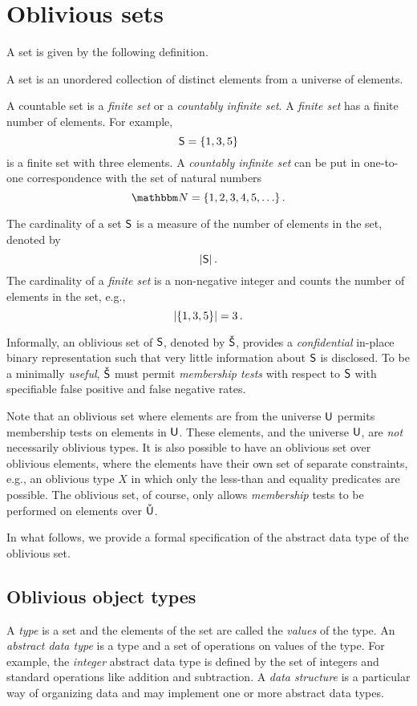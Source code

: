 \documentclass[ ../main.tex]{subfiles}
\begin{document}
\section{Oblivious sets}
\label{sec:ob_set_def}
A set is given by the following definition.
\begin{definition}
A set is an unordered collection of distinct elements from a universe of elements.
\end{definition}

A countable set is a \emph{finite set} or a \emph{countably infinite set}. A \emph{finite set} has a finite number of elements. For example,
\[
    \Set{S} = \{ 1, 3, 5 \}
\]
is a finite set with three elements. A \emph{countably infinite set} can be put in one-to-one correspondence with the set of natural numbers
\begin{equation}
    \NatSet = \{1,2,3,4,5,\ldots\}\,.
\end{equation}

The cardinality of a set $\Set{S}$ is a measure of the number of elements in the set, denoted by
\begin{equation}
    \Card{\Set{S}}\,.
\end{equation}
The cardinality of a \emph{finite set} is a non-negative integer and counts the number of elements in the set, e.g.,
\[
    \lvert\left\{ 1, 3, 5\right\}\rvert = 3\,.
\]

Informally, an oblivious set of $\Set{S}$, denoted by $\OSet{S}$, provides a \emph{confidential} in-place binary representation such that very little information about $\Set{S}$ is disclosed.
To be a minimally \emph{useful}, $\OSet{S}$ must permit \emph{membership tests} with respect to $\Set{S}$ with specifiable false positive and false negative rates.

Note that an oblivious set where elements are from the universe $\Set{U}$ permits membership tests on elements in $\Set{U}$.
These elements, and the universe $\Set{U}$, are \emph{not} necessarily oblivious types.
It is also possible to have an oblivious set over oblivious elements, where the elements have their own set of separate constraints, e.g., an oblivious type $X$ in which only the less-than and equality predicates are possible.
The oblivious set, of course, only allows \emph{membership} tests to be performed on elements over $\OSet{U}$.

In what follows, we provide a formal specification of the abstract data type of the oblivious set.

\subsection{Oblivious object types}
A \emph{type} is a set and the elements of the set are called the \emph{values} of the type. An \emph{abstract data type} is a type and a set of operations on values of the type. For example, the \emph{integer} abstract data type is defined by the set of integers and standard operations like addition and subtraction. A \emph{data structure} is a particular way of organizing data and may implement one or more abstract data types.
\end{document}
